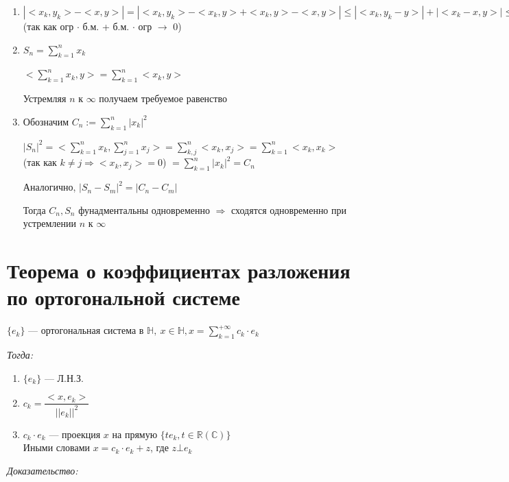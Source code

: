 \documentclass[paper=a4, fontsize=17pt]{article}
\begin{document}
\begin{enumerate}
	\item $|<x_k, y_k> - <x, y>| = |<x_k, y_k> - <x_k, y> + <x_k, y> - <x, y>| \leqslant |<x_k, y_k - y>| + |<x_k - x, y>| \leqslant |x_k| \cdot |y_k - y| + |x_k - x| \cdot |y| \rightarrow 0$ (так как огр $\cdot$ б.м. +  б.м. $\cdot$ огр $\rightarrow$ 0)

	\item $S_n = \sum\limits_{k = 1}^{n} x_k$

	$<\sum\limits_{k = 1}^n x_k, y> = \sum\limits_{k = 1}^n <x_k, y>$

	Устремляя $n$ к $\infty$ получаем требуемое равенство

	\item Обозначим $C_n := \sum\limits_{k = 1}^n |x_k|^2$

	 $|S_n|^2 = <\sum\limits_{k = 1}^n x_k, \sum\limits_{j = 1}^n x_j> = \sum\limits_{k, j}^n <x_k, x_j> = \sum\limits_{k = 1}^n <x_k, x_k>$ (так как $k \neq j \Rightarrow <x_k, x_j> = 0$) $= \sum\limits_{k = 1}^n |x_k|^2 = C_n$

	 Аналогично, $|S_n - S_m|^2 = |C_n - C_m|$

	 Тогда $C_n, S_n$ фунадментальны одновременно $\Rightarrow$ сходятся одновременно при устремлении $n$ к $\infty$
\end{enumerate}

\section{Теорема о коэффициентах разложения по ортогональной системе}

$\{e_k\}$ {{---}} ортогональная система в $\mathds{H},\ x \in \mathds{H}, x = \sum\limits_{k=1}^{+\infty} c_k \cdot e_k$

\emph{Тогда:}
\begin{enumerate}

	\item $\{e_k\}$ {{---}} Л.Н.З.

	\item $c_k = \dfrac{<x, e_k>}{||e_k||^2}$

	\item $c_k \cdot e_k$ {{---}} проекция $x$ на прямую $\{te_k, t \in \mathbb{R}(\mathbb{C})\}$\\
	Иными словами $x = c_k \cdot e_k + z$, где $z \bot e_k$

\end{enumerate}

\emph{Доказательство:}
\end{document}
